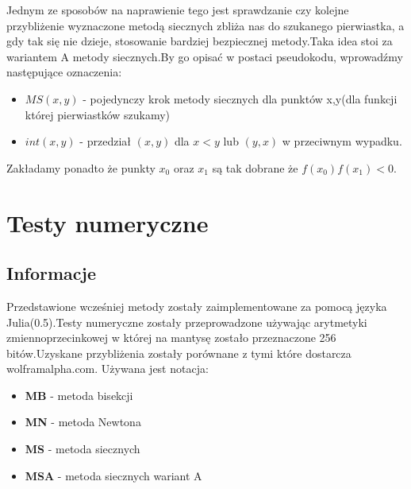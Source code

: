\documentclass[11pt,wide]{article}
\begin{document}
Jednym ze sposobów na naprawienie tego jest sprawdzanie czy kolejne przybliżenie wyznaczone metodą siecznych zbliża nas do szukanego pierwiastka, a gdy tak się nie dzieje, stosowanie bardziej bezpiecznej metody.Taka idea stoi za wariantem A metody siecznych.By go opisać w postaci pseudokodu, wprowadźmy następujące oznaczenia:
\begin{itemize}
\item $MS(x,y)$ - pojedynczy krok metody siecznych dla punktów x,y(dla funkcji której pierwiastków szukamy) 
\item $int(x,y)$ - przedział $(x,y)$ dla $x < y$ lub $(y,x)$ w przeciwnym wypadku.
\end{itemize}

Zakładamy ponadto że punkty $x_0$ oraz $x_1$ są tak dobrane że $f(x_0)f(x_1) < 0$. \newline

\begin{algorithmic}
	\Else
		\Else
		\EndIf				
	\EndIf
	\EndIf
\EndWhile
\newline
{}
\end{algorithmic}

\noindent
\newline



\section{Testy numeryczne}
\subsection{Informacje}
Przedstawione wcześniej metody zostały zaimplementowane za pomocą języka Julia(0.5).Testy numeryczne zostały przeprowadzone używając arytmetyki zmiennoprzecinkowej w której na mantysę zostało przeznaczone 256 bitów.Uzyskane przybliżenia zostały porównane z tymi które dostarcza wolframalpha.com. \newline Używana jest notacja:
\begin{itemize}
\item \textbf{MB} - metoda bisekcji
\item \textbf{MN} - metoda Newtona
\item \textbf{MS} - metoda siecznych
\item \textbf{MSA} - metoda siecznych wariant A
\end{itemize}
\end{document}

